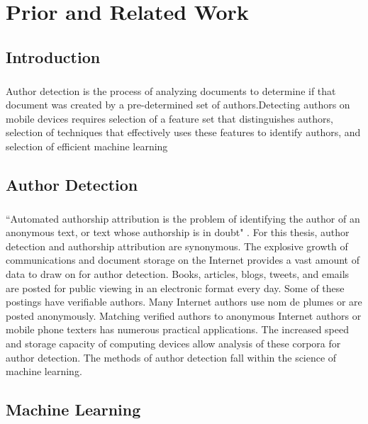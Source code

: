 \chapter {Prior and Related Work}

\section {Introduction}
	\paragraph{}Author detection is the process of analyzing documents to determine if that document was created by a pre-determined set of authors.Detecting authors on mobile devices requires selection of a feature set that distinguishes authors, selection of techniques that effectively uses these features to identify authors, and selection of efficient machine learning

\section {Author Detection}
	\paragraph{}``Automated authorship attribution is the problem of identifying the author of an anonymous text, or text whose authorship is in doubt" \cite{love_attributing_2002}.  For this thesis, author detection and authorship attribution are synonymous.  The explosive growth of communications and document storage on the Internet provides a vast amount of data to draw on for author detection.  Books, articles, blogs, tweets, and emails are posted for public viewing in an electronic format every day.  Some of these postings have verifiable authors.  Many Internet authors use nom de plumes or are posted anonymously.  Matching verified authors to anonymous Internet authors or mobile phone texters has numerous practical applications. The increased speed and storage capacity of computing devices allow analysis of these corpora for author detection. The methods of author detection fall within the science of machine learning.

\section {Machine Learning}
